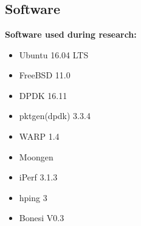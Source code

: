 \thispagestyle{empty}

\chapter{}\label{appendix:software}
\section{Software}

\textbf{Software used during research:}
\begin{itemize}
\item{Ubuntu 16.04 LTS}
\item{FreeBSD 11.0}
\item{DPDK 16.11}
\item{pktgen(dpdk) 3.3.4}
\item{WARP 1.4}
\item{Moongen}
\item{iPerf 3.1.3}
\item{hping 3}
\item{Bonesi V0.3}
\end{itemize}

